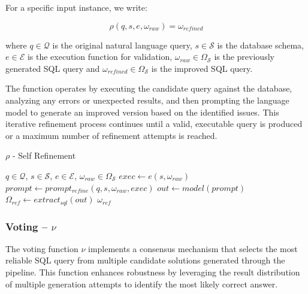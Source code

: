For a specific input instance, we write:

$$
\rho(q, s, e, \omega_{raw}) = \omega_{refined}
$$

\vspace{0.5em}

where $q \in \mathcal{Q}$ is the original natural language query, $s \in \mathcal{S}$
is the database schema, $e \in \mathcal{E}$ is the execution function for
validation, $\omega_{raw} \in \Omega_{\mathcal{S}}$ is the previously generated SQL
query and $\omega_{refined} \in \Omega_{\mathcal{S}}$ is the improved SQL query.

The function operates by executing the candidate query against the database, analyzing
any errors or unexpected results, and then prompting the language model to generate
an improved version based on the identified issues. This iterative refinement
process continues until a valid, executable query is produced or a maximum number
of refinement attempts is reached.

\begin{algorithm}
\caption{$\rho$ - Self Refinement}\label{algorithms:rho}
\begin{algorithmic}[1]
\Require $q \in \mathcal{Q}$, $s \in \mathcal{S}$, $e \in \mathcal{E}$, $\omega_{raw} \in \Omega_{\mathcal{S}}$
\State $exec \gets e(s, \omega_{raw})$                          
\State $prompt \gets prompt_{refine}(q, s, \omega_{raw}, exec)$ 
\State $out \gets model(prompt)$                                
\State $\Omega_{ref} \gets extract_{sql}(out)$                  
                           
                    
        \State \Return $\omega_{ref}$                           
    \EndIf
\EndFor
\end{algorithmic}
\end{algorithm}

\subsubsection{Voting – $\nu$}\label{design:voting-function}

The voting function $\nu$ implements a consensus mechanism that selects the most
reliable SQL query from multiple candidate solutions generated through the pipeline.
This function enhances robustness by leveraging the result distribution of multiple
generation attempts to identify the most likely correct answer.

